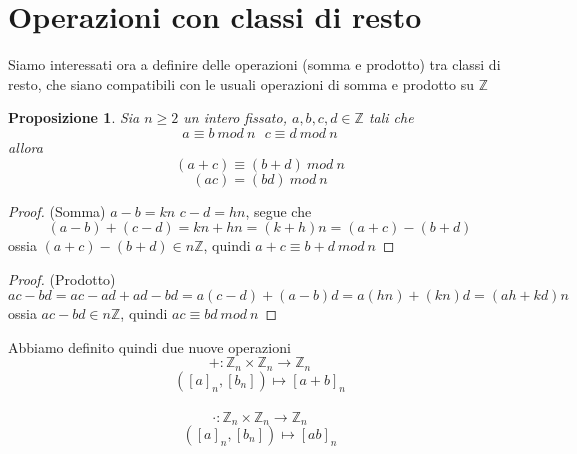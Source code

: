 \documentclass[a4paper]{report}
\newtheorem{proposition}{Proposizione}
\begin{document}
\section{Operazioni con classi di resto}
Siamo interessati ora a definire delle operazioni (somma e prodotto) tra classi di resto, che siano compatibili con le usuali operazioni di somma e prodotto su $\mathbb{Z}$
\begin{proposition}
    Sia $n\geq 2$ un intero fissato, $a,b,c,d\in\mathbb{Z}$ tali che
    \[
        a\equiv b\ mod\ n\ \ \ c\equiv d\ mod\ n
    \]
    allora
    \begin{equation}
        (a+c)\equiv (b+d)\ mod\ n
    \end{equation}
    \begin{equation}
        (ac)=(bd)\ mod\ n
    \end{equation}
\end{proposition}
\begin{proof}
    (Somma) $a-b=kn$ $c-d=hn$, segue che
    \[
        (a-b)+(c-d)=kn+hn=(k+h)n=(a+c)-(b+d)
    \]
    ossia $(a+c)-(b+d)\in n\mathbb{Z}$, quindi $a+c\equiv b+d\ mod\ n$
\end{proof}
\begin{proof}
    (Prodotto)
    \[
        ac-bd=ac-ad+ad-bd=a(c-d)+(a-b)d=a(hn)+(kn)d=(ah+kd)n
    \]
    ossia $ac-bd\in n\mathbb{Z}$, quindi $ac\equiv bd\ mod\ n$
\end{proof}
Abbiamo definito quindi due nuove operazioni
\[
    +:\mathbb{Z}_n\times\mathbb{Z}_n\rightarrow\mathbb{Z}_n
\]
\[
    ([a]_n,[b_n])\mapsto [a+b]_n
\]\\
\[
    \cdot:\mathbb{Z}_n\times\mathbb{Z}_n\rightarrow\mathbb{Z}_n
\]
\[
    ([a]_n,[b_n])\mapsto [ab]_n
\]
\end{document}
